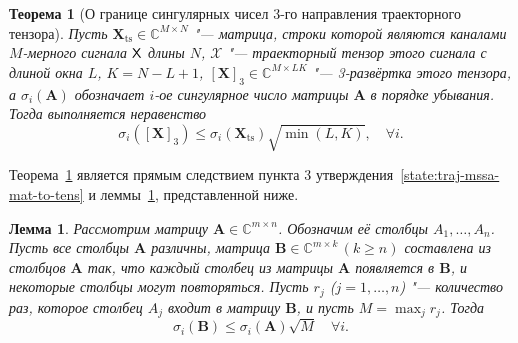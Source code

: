 \documentclass[specialist,
  substylefile = spbu.rtx,
subf,href,colorlinks=true, 12pt]{disser}
\theoremstyle{plain}
\newtheorem{theorem}{Теорема}[section]
\newtheorem{lemma}{Лемма}[section]
\theoremstyle{definition}
\theoremstyle{remark}
\begin{document}
\begin{theorem}[О границе сингулярных чисел 3-го направления
  траекторного тензора]\label{theorem:3mev-theorem}
  Пусть $\mathbf{X}_{\mathrm{ts}}\in \mathbb{C}^{M \times N}$ "---
  матрица, строки которой являются каналами $M$-мерного сигнала
  $\mathsf{X}$ длины $N$, $\mathcal{X}$ "--- траекторный тензор этого
  сигнала с длиной окна $L$, $K = N - L + 1$, $\left[\mathbf{X}\right]_3 \in
  \mathbb{C}^{M \times LK}$ "--- 3-развёртка этого тензора, а
  $\sigma_i(\mathbf{A})$ обозначает $i$-ое сингулярное число матрицы
  $\mathbf{A}$ в порядке убывания.
  Тогда выполняется неравенство
  \begin{equation*}
    \sigma_i\left(\left[\mathbf{X}\right]_3\right) \leqslant
    \sigma_i\left(\mathbf{X}_{\text{ts}}\right)\sqrt{\min(L,
    K)},\quad \forall i.
  \end{equation*}
\end{theorem}
Теорема~\ref{theorem:3mev-theorem} является прямым
следствием пункта 3 утверждения~\ref{state:traj-mssa-mat-to-tens} и
леммы~\ref{lemma:3mev-lemma},
представленной ниже.
\begin{lemma}\label{lemma:3mev-lemma}
  Рассмотрим матрицу \(\mathbf{A}\in\mathbb{C}^{m\times n}\). Обозначим её
  столбцы \(A_1,\dots,A_n\). Пусть все столбцы \(\mathbf{A}\)
  различны, матрица
  \(\mathbf{B}\in\mathbb{C}^{m\times k}\, (k \geqslant n)\) составлена из
  столбцов \(\mathbf{A}\) так,
  что каждый столбец из матрицы \(\mathbf{A}\) появляется в
  \(\mathbf{B}\), и некоторые столбцы могут повторяться. Пусть
  \(r_j\) (\(j=1,\dots,n\)) "---
  количество раз, которое столбец \(A_j\) входит в матрицу
  \(\mathbf{B}\), и пусть
  \(M=\max_j r_j\). Тогда
  \[
    \sigma_i(\mathbf{B})\leqslant \sigma_i(\mathbf{A})\sqrt{M}\quad \forall i.
  \]
\end{lemma}
\end{document}
